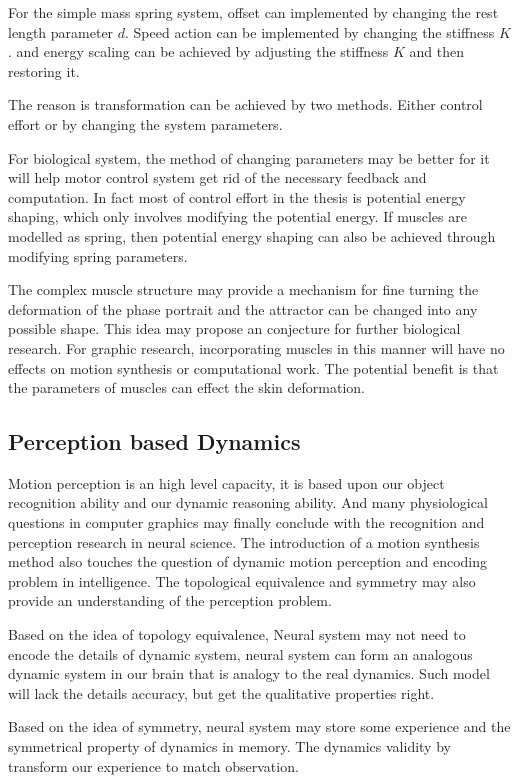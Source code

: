 For the simple  mass spring system,
offset can implemented by changing the rest length parameter $d$.
Speed action can be implemented by changing the stiffness $K$.
and energy scaling can be achieved by adjusting the stiffness $K$ and then restoring it.
 

The reason is transformation can be achieved by two methods.
Either control effort or by changing the system parameters.

For biological system, the method of changing parameters  may be better for it will help motor control system get rid of the necessary feedback and computation. 
In fact most of control effort in the thesis is potential energy shaping, which only involves  modifying the potential energy.
If muscles are modelled as spring, then potential energy shaping can also be achieved through modifying spring parameters.

The complex muscle structure may provide a mechanism for fine turning the deformation of the phase portrait and  the attractor can be changed into any possible shape.
This idea may propose an conjecture for further biological research.
For graphic research, incorporating muscles in this manner will have no effects on motion synthesis or computational work.
The potential benefit is that the parameters of muscles can effect the skin deformation.



\subsection{Perception based Dynamics}
Motion perception is an high level capacity, it is based upon our object recognition ability and our dynamic reasoning ability.
And many physiological questions in computer graphics may finally conclude with the recognition and perception research in neural science.
The introduction of a motion synthesis method also touches the question of dynamic motion perception and encoding problem in intelligence.
The topological equivalence and symmetry may also provide an understanding of the perception problem.

Based on the idea of topology equivalence,
Neural system may not need to encode the details of dynamic system, neural system can form an analogous dynamic system in our brain that is analogy to the real dynamics.
Such model will lack the details accuracy, but get the qualitative properties right.

Based on the idea of symmetry, neural system may store some experience and the symmetrical property of dynamics in memory.
The dynamics validity by transform our experience to match observation.


